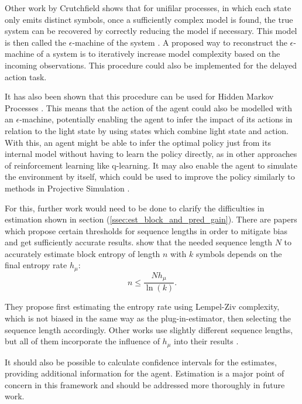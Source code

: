 \documentclass[12pt,a4paper]{article}
\begin{document}
Other work by Crutchfield shows that for unifilar processes, in which each state only emits distinct symbols, once a sufficiently complex model is found, the true system can be recovered by correctly reducing the model if necessary.
This model is then called the $\epsilon$-machine of the system \autocite{crutchfield1994calculi}.
A proposed way to reconstruct the $\epsilon$-machine of a system is to iteratively increase model complexity based on the incoming observations.
This procedure could also be implemented for the delayed action task.

It has also been shown that this procedure can be used for Hidden Markov Processes \autocite{jurgens2021HMP}.
This means that the action of the agent could also be modelled with an $\epsilon$-machine, potentially enabling the agent to infer the impact of its actions in relation to the light state by using states which combine light state and action.
With this, an agent might be able to infer the optimal policy just from its internal model without having to learn the policy directly, as in other approaches of reinforcement learning like q-learning.
It may also enable the agent to simulate the environment by itself, which could be used to improve the policy similarly to methods in Projective Simulation \autocite{briegel2012ps}.

For this, further work would need to be done to clarify the difficulties in estimation shown in section (\ref{ssec:est_block_and_pred_gain}).
There are papers which propose certain thresholds for sequence lengths in order to mitigate bias and get sufficiently accurate results.
\autocite{lesne2009entropy} show that the needed sequence length $N$ to accurately estimate block entropy of length $n$ with $k$ symbols depends on the final entropy rate $h_\mu$:
\begin{equation}
    \label{eq:lesne_seq_length}
    n \leq \frac{N h_\mu}{\ln(k)}.
\end{equation}

They propose first estimating the entropy rate using Lempel-Ziv complexity, which is not biased in the same way as the plug-in-estimator, then selecting the sequence length accordingly.
Other works use slightly different sequence lengths, but all of them incorporate the influence of $h_\mu$ into their results \autocite{larson2011block,dkebowski2016consistency}.

It should also be possible to calculate confidence intervals for the estimates, providing additional information for the agent.
Estimation is a major point of concern in this framework and should be addressed more thoroughly in future work.
\end{document}
